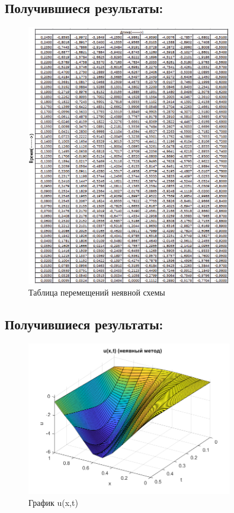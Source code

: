\documentclass[]{article}
\begin{document}
	\subsection*{Получившиеся результаты:}
			\begin{figure}[H]
			\centering
			\includegraphics[width=0.8\textwidth]{tab2}
			\caption{Таблица перемещений неявной схемы}
			\label{pиc3}
		\end{figure}
	\newpage
	\subsection*{Получившиеся результаты:}
	\begin{figure}[H]
		\centering
		\includegraphics[width=0.8\textwidth]{surfnotyavn}
		\caption{График u(x,t)}
		\label{pиc4}
	\end{figure}
	\newpage
\end{document}
